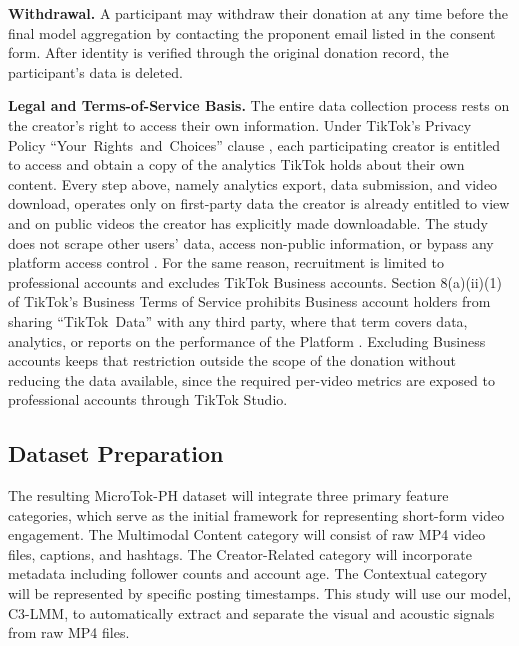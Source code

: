\textbf{Withdrawal.} A participant may withdraw their donation at any time before the final model aggregation by contacting the proponent email listed in the consent form. After identity is verified through the original donation record, the participant's data is deleted. %

\textbf{Legal and Terms-of-Service Basis.} The entire data collection process rests on the creator's right to access their own information. Under TikTok's Privacy Policy \mbox{``Your Rights and Choices''} clause \mbox{\cite{tiktok_privacy_2026}}, each participating creator is entitled to access and obtain a copy of the analytics TikTok holds about their own content. Every step above, namely analytics export, data submission, and video download, operates only on first-party data the creator is already entitled to view and on public videos the creator has explicitly made downloadable. The study does not scrape other users' data, access non-public information, or bypass any platform access control \mbox{\cite{tiktok_tos_2026}}. For the same reason, recruitment is limited to professional accounts and excludes TikTok Business accounts. Section 8(a)(ii)(1) of TikTok's Business Terms of Service prohibits Business account holders from sharing \mbox{``TikTok Data''} with any third party, where that term covers data, analytics, or reports on the performance of the Platform \mbox{\cite{tiktok_business_tos_2026}}. Excluding Business accounts keeps that restriction outside the scope of the donation without reducing the data available, since the required per-video metrics are exposed to professional accounts through TikTok Studio.

\subsection{Dataset Preparation}

The resulting MicroTok-PH dataset will integrate three primary feature categories, which serve as the initial framework for representing short-form video engagement. The Multimodal Content category will consist of raw MP4 video files, captions, and hashtags. The Creator-Related category will incorporate metadata including follower counts and account age. The Contextual category will be represented by specific posting timestamps. This study will use our model, C3-LMM, to automatically extract and separate the visual and acoustic signals from raw MP4 files. 

